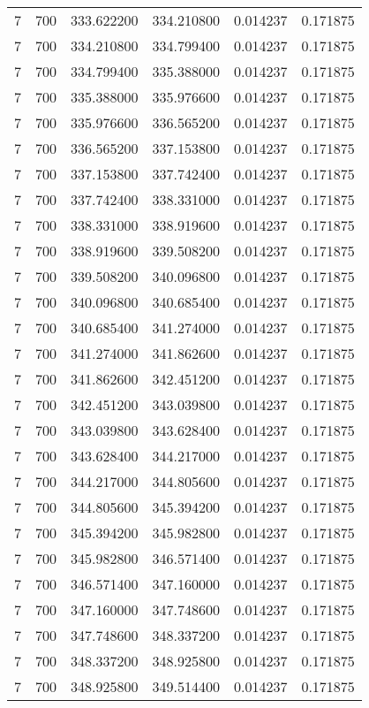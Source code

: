 \begin{longtable}{rrrrrr}
7 & 700 & 333.622200 & 334.210800 & 0.014237 & 0.171875 \\
7 & 700 & 334.210800 & 334.799400 & 0.014237 & 0.171875 \\
7 & 700 & 334.799400 & 335.388000 & 0.014237 & 0.171875 \\
7 & 700 & 335.388000 & 335.976600 & 0.014237 & 0.171875 \\
7 & 700 & 335.976600 & 336.565200 & 0.014237 & 0.171875 \\
7 & 700 & 336.565200 & 337.153800 & 0.014237 & 0.171875 \\
7 & 700 & 337.153800 & 337.742400 & 0.014237 & 0.171875 \\
7 & 700 & 337.742400 & 338.331000 & 0.014237 & 0.171875 \\
7 & 700 & 338.331000 & 338.919600 & 0.014237 & 0.171875 \\
7 & 700 & 338.919600 & 339.508200 & 0.014237 & 0.171875 \\
7 & 700 & 339.508200 & 340.096800 & 0.014237 & 0.171875 \\
7 & 700 & 340.096800 & 340.685400 & 0.014237 & 0.171875 \\
7 & 700 & 340.685400 & 341.274000 & 0.014237 & 0.171875 \\
7 & 700 & 341.274000 & 341.862600 & 0.014237 & 0.171875 \\
7 & 700 & 341.862600 & 342.451200 & 0.014237 & 0.171875 \\
7 & 700 & 342.451200 & 343.039800 & 0.014237 & 0.171875 \\
7 & 700 & 343.039800 & 343.628400 & 0.014237 & 0.171875 \\
7 & 700 & 343.628400 & 344.217000 & 0.014237 & 0.171875 \\
7 & 700 & 344.217000 & 344.805600 & 0.014237 & 0.171875 \\
7 & 700 & 344.805600 & 345.394200 & 0.014237 & 0.171875 \\
7 & 700 & 345.394200 & 345.982800 & 0.014237 & 0.171875 \\
7 & 700 & 345.982800 & 346.571400 & 0.014237 & 0.171875 \\
7 & 700 & 346.571400 & 347.160000 & 0.014237 & 0.171875 \\
7 & 700 & 347.160000 & 347.748600 & 0.014237 & 0.171875 \\
7 & 700 & 347.748600 & 348.337200 & 0.014237 & 0.171875 \\
7 & 700 & 348.337200 & 348.925800 & 0.014237 & 0.171875 \\
7 & 700 & 348.925800 & 349.514400 & 0.014237 & 0.171875 \\

\end{longtable}

